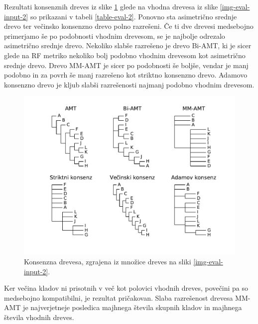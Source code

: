 \documentclass[a4paper, 12pt]{book}
\begin{document}
Rezultati konsenznih dreves iz slike \ref{img-eval-result-2} glede na vhodna drevesa iz slike \ref{img-eval-input-2}
so prikazani v tabeli \ref{table-eval-2}. Ponovno sta asimetrično srednje drevo ter večinsko konsenzno drevo polno 
razrešeni. Če ti dve drevesi medsebojno primerjamo še po podobnosti vhodnim drevesom, se je najbolje odrezalo 
asimetrično srednje drevo. Nekoliko slabše razrešeno je drevo Bi-AMT, ki je sicer glede na RF metriko nekoliko bolj 
podobno vhodnim drevesom kot asimetrično srednje drevo. Drevo MM-AMT je sicer po podobnosti še boljše, vendar je manj 
podobno in za povrh še manj razrešeno kot striktno konsenzno drevo. Adamovo konsenzno drevo je kljub slabši razrešenosti
najmanj podobno vhodnim drevesom.

\begin{figure}[h!]
	\begin{center}
		\includegraphics[scale=0.64, clip=true, trim=1.5cm 1.5cm 1cm 0.8cm]{gfx/eval_gfx_2.pdf}
	\end{center}
	\caption{Konsenzna drevesa, zgrajena iz množice dreves na sliki \ref{img-eval-input-2}.}
	\label{img-eval-result-2}
\end{figure}

Ker večina kladov ni prisotnih v več kot polovici vhodnih dreves, povečini pa so medsebojno kompatibilni, je rezultat 
pričakovan. Slaba razrešenost drevesa MM-AMT je najverjetneje posledica majhnega števila skupnih kladov in majhnega 
števila vhodnih dreves. 
\end{document}
